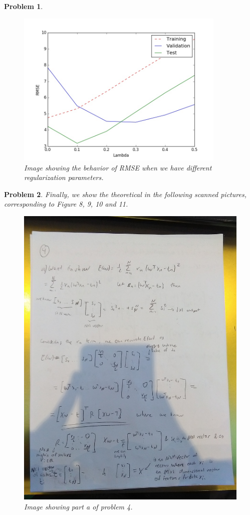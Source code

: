 \documentclass[12pt]{article}
\newtheorem{problem}{Problem}%
\begin{document}
\begin{problem}
\begin{enumerate}
\begin{figure}[!htbp]
\centering
\includegraphics[width=10cm]{Problem3b_lambda.jpg}
\caption{Image showing the behavior of RMSE when we have different regularization parameters.}
\end{figure}

\end{enumerate}
\end{problem}

\begin{problem}
\normalfont
Finally, we show the theoretical in the following scanned pictures, corresponding to Figure 8, 9, 10 and 11.

\begin{figure}[!htbp]
\centering
\includegraphics[width=15cm]{Problem4a.jpg}
\caption{Image showing part a of problem 4.}
\end{figure}
\end{problem}
\end{document}
